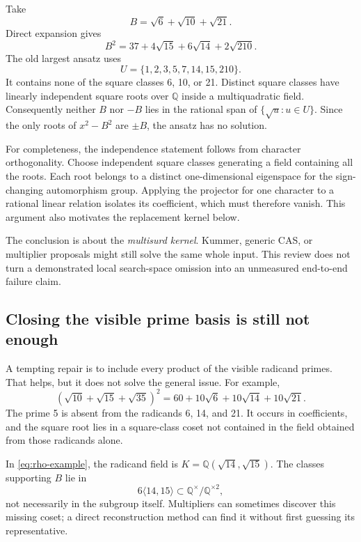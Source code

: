 \documentclass[11pt,a4paper]{article}
\newcommand{\Q}{\mathbb Q}\newcommand{\C}{\mathbb C}
\theoremstyle{definition}\newtheorem{definition}[proposition]{Definition}
\theoremstyle{remark}\newtheorem{remark}[proposition]{Remark}
\begin{document}
Take
\begin{equation}\label{eq:beta-example}
 B=\sqrt6+\sqrt{10}+\sqrt{21}.
\end{equation}
Direct expansion gives
\begin{equation}\label{eq:rho-example}
 B^2=37+4\sqrt{15}+6\sqrt{14}+2\sqrt{210}.
\end{equation}
The old largest ansatz uses
\begin{equation}
 U=\{1,2,3,5,7,14,15,210\}.
\end{equation}
It contains none of the square classes 6, 10, or 21. Distinct square classes
have linearly independent square roots over $\Q$ inside a multiquadratic field.
Consequently neither $B$ nor $-B$ lies in the rational span of
$\{\sqrt u:u\in U\}$. Since the only roots of $x^2-B^2$ are $\pm B$, the ansatz
has no solution.

For completeness, the independence statement follows from character
orthogonality. Choose independent square classes generating a field containing
all the roots. Each root belongs to a distinct one-dimensional eigenspace for
the sign-changing automorphism group. Applying the projector for one character
to a rational linear relation isolates its coefficient, which must therefore
vanish. This argument also motivates the replacement kernel below.

The conclusion is about the \emph{multisurd kernel}. Kummer, generic CAS, or
multiplier proposals might still solve the same whole input. This review does
not turn a demonstrated local search-space omission into an unmeasured
end-to-end failure claim.

\subsection{Closing the visible prime basis is still not enough}
A tempting repair is to include every product of the visible radicand primes.
That helps, but it does not solve the general issue. For example,
\begin{equation}
 \left(\sqrt{10}+\sqrt{15}+\sqrt{35}\right)^2
 =60+10\sqrt6+10\sqrt{14}+10\sqrt{21}.
\end{equation}
The prime 5 is absent from the radicands 6, 14, and 21. It occurs in coefficients,
and the square root lies in a square-class coset not contained in the field
obtained from those radicands alone.

In \eqref{eq:rho-example}, the radicand field is
$K=\Q(\sqrt{14},\sqrt{15})$. The classes supporting $B$ lie in
\begin{equation}
 6\langle14,15\rangle\subset\Q^\times/\Q^{\times2},
\end{equation}
not necessarily in the subgroup itself. Multipliers can sometimes discover
this missing coset; a direct reconstruction method can find it without first
guessing its representative.
\end{document}
